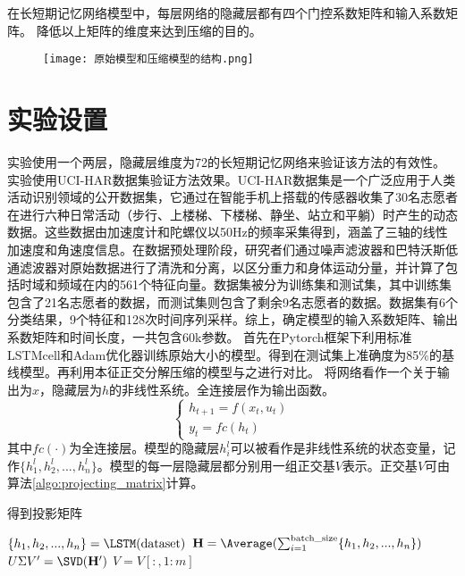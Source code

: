 在长短期记忆网络模型中，每层网络的隐藏层都有四个门控系数矩阵和输入系数矩阵。
降低以上矩阵的维度来达到压缩的目的。

\begin{figure}[!htbp]
  \centering
  \texttt{[image: 原始模型和压缩模型的结构.png]}
  \label{fig:原始模型和压缩模型的结构}
\end{figure}
\section{实验设置}
实验使用一个两层，隐藏层维度为72的长短期记忆网络来验证该方法的有效性。
实验使用UCI-HAR数据集\cite{anguita2012human}验证方法效果。UCI-HAR数据集是一个广泛应用于人类活动识别领域的公开数据集，它通过在智能手机上搭载的传感器收集了30名志愿者在进行六种日常活动（步行、上楼梯、下楼梯、静坐、站立和平躺）时产生的动态数据。这些数据由加速度计和陀螺仪以50Hz的频率采集得到，涵盖了三轴的线性加速度和角速度信息。在数据预处理阶段，研究者们通过噪声滤波器和巴特沃斯低通滤波器对原始数据进行了清洗和分离，以区分重力和身体运动分量，并计算了包括时域和频域在内的561个特征向量。数据集被分为训练集和测试集，其中训练集包含了21名志愿者的数据，而测试集则包含了剩余9名志愿者的数据。数据集有6个分类结果，9个特征和128次时间序列采样。综上，确定模型的输入系数矩阵、输出系数矩阵和时间长度，一共包含60k参数。
首先在Pytorch框架下利用标准LSTMcell和Adam优化器训练原始大小的模型。得到在测试集上准确度为85\%的基线模型。再利用本征正交分解压缩的模型与之进行对比。
将网络看作一个关于输出为$x$，隐藏层为$h$的非线性系统。全连接层作为输出函数。
\begin{equation}
  \label{eq:22}
\left\{ \begin{array}{l}
  {h_{t + 1}} = f({x_t},{u_t})\\
  {y_t} = fc({h_t})
  \end{array} \right.
\end{equation}
其中$fc( \cdot )$为全连接层。模型的隐藏层$h_i^l$可以被看作是非线性系统的状态变量，记作$\{ h_1^l,h_2^l,...,h_n^l\}$。模型的每一层隐藏层都分别用一组正交基$V$表示。正交基$V$可由算法\ref{algo:projecting_matrix}计算。
\begin{algorithm}[!htbp]
  \caption{得到投影矩阵}
  \label{algo:projecting_matrix}
  \DontPrintSemicolon
  
  
  \vspace{5pt}
  
  $\{h_1, h_2, ..., h_n\} = \LSTM(\text{dataset})$\;
  $\mathbf{H} = \Average(\sum_{i=1}^{\text{batch\_size}} \{h_1, h_2, ..., h_n\})$\;
  $U \Sigma V' = \SVD(\mathbf{H}')$\;
  $V = V[:, 1:m]$\;
  
\end{algorithm}

